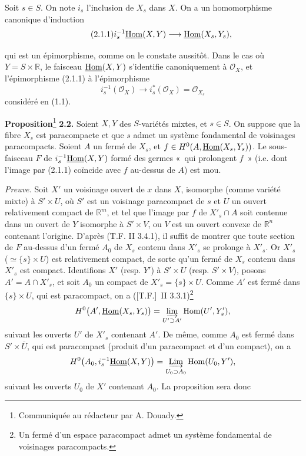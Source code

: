 \documentclass[11pt]{article}
\providecommand{\cO}{\mathcal O}\providecommand{\R}{\mathbb R}\providecommand{\N}{\mathbb N}
\begin{document}
Soit $s\in S$. On note $i_s$ l'inclusion de $X_s$ dans $X$. On a un homomorphisme canonique d'induction
\begin{equation}\tag{2.1.1}
  i_s^{-1}\underline{\operatorname{Hom}}(X,Y)
  \longrightarrow
  \underline{\operatorname{Hom}}(X_s,Y_s),
\end{equation}

qui est un
épimorphisme, comme on le constate aussitôt. Dans le cas où $Y=S\times\R$, le faisceau $\underline{\operatorname{Hom}}(X,Y)$ s'identifie canoniquement à $\cO_X$, et l'épimorphisme (2.1.1) à l'épimorphisme
\[
  i_s^{-1}(\cO_X)\longrightarrow i_s^*(\cO_X)=\cO_{X_s}
\]
considéré en (1.1).

\textbf{Proposition}\footnote{Communiquée au rédacteur par A. Douady.} \textbf{2.2.} Soient $X,Y$ des $S$-variétés mixtes, et $s\in S$. On suppose que la fibre $X_s$ est paracompacte et que $s$ admet un système fondamental de voisinages paracompacts. Soient $A$ un fermé de $X_s$, et $f\in H^0(A,\underline{\operatorname{Hom}}(X_s,Y_s))$.
Le sous-faisceau $F$ de $i_s^{-1}\underline{\operatorname{Hom}}(X,Y)$ formé des germes «~qui prolongent $f$~» (i.e. dont l'image par (2.1.1) coïncide avec $f$ au-dessus de $A$) est mou.

\emph{Preuve.} Soit $X'$ un voisinage ouvert de $x$ dans $X$, isomorphe (comme variété mixte) à $S'\times U$, où $S'$ est un voisinage paracompact de $s$ et $U$ un ouvert relativement compact de $\R^m$, et tel que l'image par $f$ de $X'_s\cap A$ soit contenue dans un ouvert de $Y$ isomorphe à $S'\times V$, ou $V$ est un ouvert convexe de $\R^n$ contenant l'origine. D'après (T.F. II 3.4.1), il suffit de montrer que toute section de $F$ au-dessus d'un fermé $A_0$ de $X_s$ contenu dans $X'_s$ se prolonge à $X'_s$. Or $X'_s$ ($\simeq\{s\}\times U$) est relativement compact, de sorte qu'un fermé de $X_s$ contenu dans $X'_s$ est compact. Identifions $X'$ (resp. $Y'$) à $S'\times U$ (resp. $S'\times V$), posons $A'=A\cap X'_s$, et soit $A_0$ un compact de $X'_s=\{s\}\times U$. Comme $A'$ est fermé dans $\{s\}\times U$, qui est paracompact, on a ([T.F.]~II 3.3.1)\footnote{Un fermé d'un espace paracompact admet un système fondamental de voisinages paracompacts.}
\[
  H^0\bigl(A',\underline{\operatorname{Hom}}(X_s,Y_s)\bigr)
  =\varinjlim_{U'\supset A'}\operatorname{Hom}(U',Y'_s),
\]
suivant les ouverts $U'$ de $X'_s$ contenant $A'$. De même, comme $A_0$ est fermé dans $S'\times \overline U$, qui est paracompact (produit d'un paracompact et d'un compact), on a
\[
  H^0\bigl(A_0,i_s^{-1}\underline{\operatorname{Hom}}(X,Y)\bigr)
  =\mathop{\underrightarrow{\mathrm{Lim}}}\limits_{U_0\supset A_0}\operatorname{Hom}(U_0,Y'),
\]
suivant les ouverts $U_0$ de $X'$ contenant $A_0$. La proposition sera donc
\end{document}
